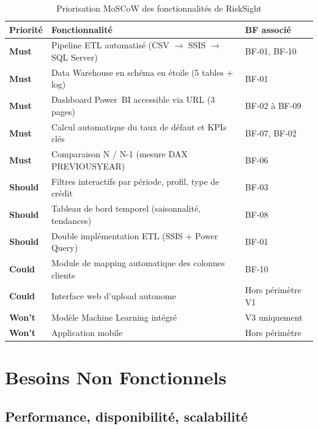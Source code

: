 \documentclass[12pt, a4paper]{report}
\begin{document}
\begin{table}[H]
\centering
\caption{Priorisation MoSCoW des fonctionnalités de RiskSight}
\label{tab:moscow}
\renewcommand{\arraystretch}{2}
\begin{tabularx}{\textwidth}{p{2cm} X p{2.5cm}}
\toprule
\rowcolor{primary!12}
Priorité & Fonctionnalité & BF associé \\
\midrule
\textbf{Must} & Pipeline ETL automatisé (CSV $\to$ SSIS $\to$ SQL Server) & BF-01, BF-10 \\
\textbf{Must} & Data Warehouse en schéma en étoile (5 tables + log) & BF-01 \\
\textbf{Must} & Dashboard Power~BI accessible via URL (3 pages) & BF-02 à BF-09 \\
\textbf{Must} & Calcul automatique du taux de défaut et KPIs clés & BF-07, BF-02 \\
\textbf{Must} & Comparaison N / N-1 (mesure DAX PREVIOUSYEAR) & BF-06 \\
\textbf{Should} & Filtres interactifs par période, profil, type de crédit & BF-03 \\
\textbf{Should} & Tableau de bord temporel (saisonnalité, tendances) & BF-08 \\
\textbf{Should} & Double implémentation ETL (SSIS + Power Query) & BF-01 \\
\textbf{Could} & Module de mapping automatique des colonnes clients & BF-10 \\
\textbf{Could} & Interface web d'upload autonome & Hors \newline périmètre V1 \\
\textbf{Won't} & Modèle Machine Learning intégré & V3 \newline uniquement \\
\textbf{Won't} & Application mobile & Hors \newline périmètre \\
\bottomrule
\end{tabularx}
\end{table}

\newpage
\section{Besoins Non Fonctionnels}

\subsection{Performance, disponibilité, scalabilité}
\end{document}
